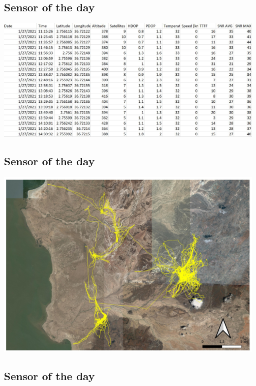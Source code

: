 \documentclass[
  letterpaper,
  DIV=11,
  numbers=noendperiod]{scrartcl}
\begin{document}
\hypertarget{sensor-of-the-day-2}{%
\subsection{Sensor of the day}\label{sensor-of-the-day-2}}

\includegraphics{InClassStatic/collarData.JPG}

\hypertarget{sensor-of-the-day-3}{%
\subsection{Sensor of the day}\label{sensor-of-the-day-3}}

\includegraphics{InClassStatic/animaltracks.jpg}

\hypertarget{sensor-of-the-day-4}{%
\subsection{Sensor of the day}\label{sensor-of-the-day-4}}
\end{document}
